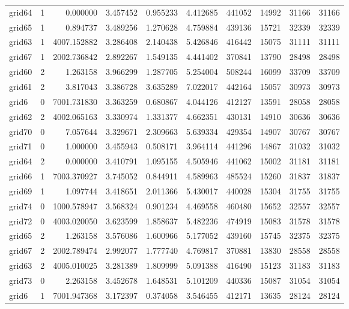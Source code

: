 \documentclass[../../../thesis.tex]{subfiles}
\begin{document}
\begin{longtable}{|l|r|r|r|r|r|r|r|r|r|}
grid64 & 1 & 0.000000 & 3.457452 & 0.955233 & 4.412685 & 441052 & 14992 & 31166 & 31166 \\
grid65 & 1 & 0.894737 & 3.489256 & 1.270628 & 4.759884 & 439136 & 15721 & 32339 & 32339 \\
grid63 & 1 & 4007.152882 & 3.286408 & 2.140438 & 5.426846 & 416442 & 15075 & 31111 & 31111 \\
grid67 & 1 & 2002.736842 & 2.892267 & 1.549135 & 4.441402 & 370841 & 13790 & 28498 & 28498 \\
grid60 & 2 & 1.263158 & 3.966299 & 1.287705 & 5.254004 & 508244 & 16099 & 33709 & 33709 \\
grid61 & 2 & 3.817043 & 3.386728 & 3.635289 & 7.022017 & 442164 & 15057 & 30973 & 30973 \\
grid6 & 0 & 7001.731830 & 3.363259 & 0.680867 & 4.044126 & 412127 & 13591 & 28058 & 28058 \\
grid62 & 2 & 4002.065163 & 3.330974 & 1.331377 & 4.662351 & 430131 & 14910 & 30636 & 30636 \\
grid70 & 0 & 7.057644 & 3.329671 & 2.309663 & 5.639334 & 429354 & 14907 & 30767 & 30767 \\
grid71 & 0 & 1.000000 & 3.455943 & 0.508171 & 3.964114 & 441296 & 14867 & 31032 & 31032 \\
grid64 & 2 & 0.000000 & 3.410791 & 1.095155 & 4.505946 & 441062 & 15002 & 31181 & 31181 \\
grid66 & 1 & 7003.370927 & 3.745052 & 0.844911 & 4.589963 & 485524 & 15260 & 31837 & 31837 \\
grid69 & 1 & 1.097744 & 3.418651 & 2.011366 & 5.430017 & 440028 & 15304 & 31755 & 31755 \\
grid74 & 0 & 1000.578947 & 3.568324 & 0.901234 & 4.469558 & 460480 & 15652 & 32557 & 32557 \\
grid72 & 0 & 4003.020050 & 3.623599 & 1.858637 & 5.482236 & 474919 & 15083 & 31578 & 31578 \\
grid65 & 2 & 1.263158 & 3.576086 & 1.600966 & 5.177052 & 439160 & 15745 & 32375 & 32375 \\
grid67 & 2 & 2002.789474 & 2.992077 & 1.777740 & 4.769817 & 370881 & 13830 & 28558 & 28558 \\
grid63 & 2 & 4005.010025 & 3.281389 & 1.809999 & 5.091388 & 416490 & 15123 & 31183 & 31183 \\
grid73 & 0 & 2.263158 & 3.452678 & 1.648531 & 5.101209 & 440336 & 15087 & 31054 & 31054 \\
grid6 & 1 & 7001.947368 & 3.172397 & 0.374058 & 3.546455 & 412171 & 13635 & 28124 & 28124 \\

\end{longtable}
\end{document}
